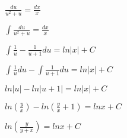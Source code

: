 \documentclass{article}
\begin{document}
\begin{flushleft}
   $\frac{du}{u^2 + u} = \frac{dx}{x}$
\end{flushleft}

\begin{flushleft}
   $\int\frac{du}{u^2 + u} = \frac{dx}{x}$
\end{flushleft}

\begin{flushleft}
 $\int\frac{1}{u} - \frac{1}{u+1}du = ln|x| + C$
\end{flushleft}

\begin{flushleft}
   $\int\frac{1}{u}du - \int\frac{1}{u + 1}du = ln|x| + C$
\end{flushleft}

\begin{flushleft}
    $ln|u| - ln|u + 1| = ln|x| + C$
\end{flushleft}

\begin{flushleft}
   $ln(\frac{y}{x}) - ln(\frac{y}{x} + 1) = lnx + C$
\end{flushleft}

\begin{flushleft}
  $ln(\frac{y}{y + x}) = lnx + C$
\end{flushleft}

\begin{center}
\end{center}
\end{document}

